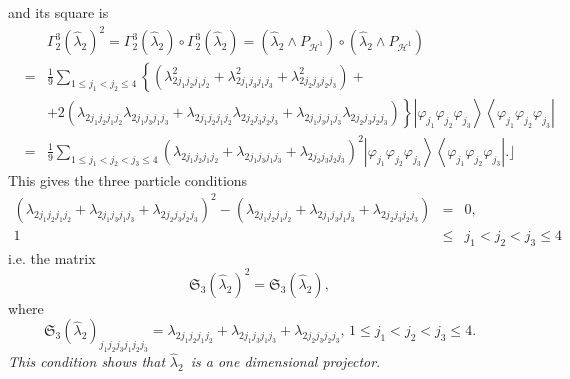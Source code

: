 \documentclass[12pt]{article}
\begin{document}
and its square is 
\begin{eqnarray*}
&&\Gamma _{2}^{3}\left( \hat{\lambda}_{2}\right) ^{2}=\Gamma _{2}^{3}\left( 
\hat{\lambda}_{2}\right) \circ \Gamma _{2}^{3}\left( \hat{\lambda}%
_{2}\right) =\left( \hat{\lambda}_{2}\wedge P_{\mathcal{H}^{1}}\right) \circ
\left( \hat{\lambda}_{2}\wedge P_{\mathcal{H}^{1}}\right) \\
&=&\frac{1}{9}\sum_{1\leq j_{1}<j_{2}\leq 4}\left\{ \left( \lambda
_{2j_{1}j_{2}j_{1}j_{2}}^{2}+\lambda _{2j_{1}j_{3}j_{1}j_{3}}^{2}+\lambda
_{2j_{2}j_{3}j_{2}j_{3}}^{2}\right) \right. + \\
&&+\left. 2\left( \lambda _{2j_{1}j_{2}j_{1}j_{2}}\lambda
_{2j_{1}j_{3}j_{1}j_{3}}+\lambda _{2j_{1}j_{2}j_{1}j_{2}}\lambda
_{2j_{2}j_{3}j_{2}j_{3}}+\lambda _{2j_{1}j_{3}j_{1}j_{3}}\lambda
_{2j_{2}j_{3}j_{2}j_{3}}\right) \right\} \left\vert \varphi _{j_{1}}\varphi
_{j_{2}}\varphi _{j_{3}}\right\rangle \left\langle \varphi _{j_{1}}\varphi
_{j_{2}}\varphi _{j_{3}}\right\vert \\
&=&\frac{1}{9}\sum_{1\leq j_{1}<j_{2}<j_{3}\leq 4}\left( \lambda
_{2j_{1}j_{2}j_{1}j_{2}}+\lambda _{2j_{1}j_{3}j_{1}j_{3}}+\lambda
_{2j_{2}j_{3}j_{2}j_{3}}\right) ^{2}\left\vert \varphi _{j_{1}}\varphi
_{j_{2}}\varphi _{j_{3}}\right\rangle \left\langle \varphi _{j_{1}}\varphi
_{j_{2}}\varphi _{j_{3}}\right\vert .\rfloor
\end{eqnarray*}%
This gives the three particle conditions%
\begin{eqnarray*}
\left( \lambda _{2j_{1}j_{2}j_{1}j_{2}}+\lambda
_{2j_{1}j_{3}j_{1}j_{3}}+\lambda _{2j_{2}j_{3}j_{2}j_{3}}\right) ^{2}-\left(
\lambda _{2j_{1}j_{2}j_{1}j_{2}}+\lambda _{2j_{1}j_{3}j_{1}j_{3}}+\lambda
_{2j_{2}j_{3}j_{2}j_{3}}\right) &=&0,\, \\
1 &\leq &j_{1}<j_{2}<j_{3}\leq 4
\end{eqnarray*}%
i.e. the matrix 
\begin{equation*}
\mathfrak{S}_{3}\left( \hat{\lambda}_{2}\right) ^{2}=\mathfrak{S}_{3}\left( 
\hat{\lambda}_{2}\right) ,
\end{equation*}%
where 
\begin{equation*}
\mathfrak{S}_{3}\left( \hat{\lambda}_{2}\right)
_{j_{1}j_{2}j_{3}j_{1}j_{2}j_{3}}=\lambda _{2j_{1}j_{2}j_{1}j_{2}}+\lambda
_{2j_{1}j_{3}j_{1}j_{3}}+\lambda _{2j_{2}j_{3}j_{2}j_{3}},\,1\leq
j_{1}<j_{2}<j_{3}\leq 4.
\end{equation*}%
\emph{This condition shows that }$\hat{\lambda}_{2}$\emph{\ is a one
dimensional projector}.
\end{document}
